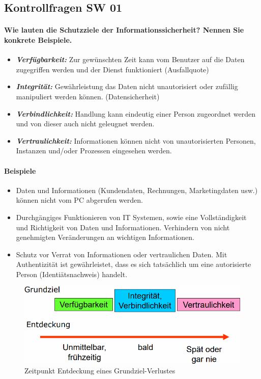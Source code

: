 \documentclass[10pt,a4paper]{article}
\begin{document}
\subsection*{Kontrollfragen SW 01}
\paragraph*{Wie lauten die Schutzziele der Informationssicherheit? Nennen Sie konkrete Beispiele.}
\begin{itemize}[noitemsep,topsep=0pt,leftmargin=*]
    \item \textbf{\textsl{Verfügbarkeit:}} Zur gewünschten Zeit kann vom Benutzer auf die Daten zugegriffen werden und der Dienst funktioniert (Ausfallquote)
    \item \textbf{\textsl{Integrität:}} Gewährleistung das Daten nicht unautorisiert oder zufällig manipuliert werden können. (Datensicherheit)
    \item \textbf{\textsl{Verbindlichkeit:}} Handlung kann eindeutig einer Person zugeordnet werden und von dieser auch nicht geleugnet werden.
    \item \textbf{\textsl{Vertraulichkeit:}} Informationen können nicht von unautorisierten Personen, Instanzen und/oder Prozessen eingesehen werden.
\end{itemize}
\noindent
\paragraph*{Beispiele}
\begin{itemize}[noitemsep,topsep=0pt,leftmargin=*]
    \item Daten und Informationen (Kundendaten, Rechnungen, Marketingdaten usw.) können nicht vom PC abgerufen werden.
    \item Durchgängiges Funktionieren von IT Systemen, sowie eine Vollständigkeit und Richtigkeit von Daten und Informationen. Verhindern von nicht genehmigten Veränderungen an wichtigen Informationen.
    \item Schutz vor Verrat von Informationen oder vertraulichen Daten. Mit Authentizität ist gewährleistet, dass es sich tatsächlich um eine autorisierte Person (Identiätsnachweis) handelt.
\end{itemize}
\begin{figure}[H]
    \begin{center}
    \includegraphics[width=16cm]{images/grundziel-entdeckung.png}
    \caption{Zeitpunkt Entdeckung eines Grundziel-Verlustes}
    \label{grundziel-entdeckung}
    \end{center}
\end{figure}
\end{document}
